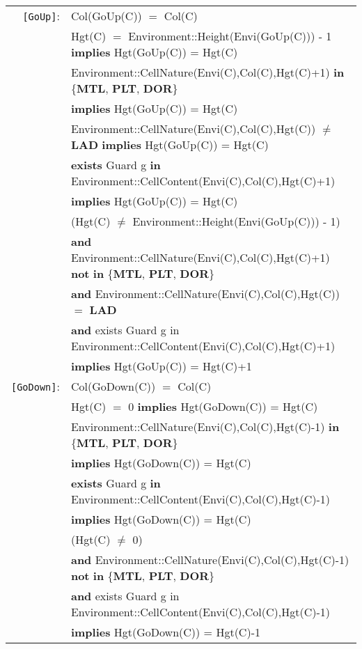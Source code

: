 \documentclass[7pt]{article}
\begin{document}
\newpage
\begin{tabular}{rl}

\texttt{[GoUp]}: & \textrm{Col(GoUp(C))} $=$ \textrm{Col(C)}\\
& \textrm{Hgt(C)} $=$ Environment::Height(Envi(GoUp(C))) - 1 \textbf{implies} \textrm{Hgt(GoUp(C))} = \textrm{Hgt(C)} \\
& \textrm{Environment::CellNature(Envi(C),Col(C),Hgt(C)+1)} \textbf{in} \{\textbf{MTL}, \textbf{PLT}, \textbf{DOR}\} \\
& \quad \textbf{implies} \textrm{Hgt(GoUp(C))} = \textrm{Hgt(C)} \\
& \textrm{Environment::CellNature(Envi(C),Col(C),Hgt(C))} $\neq$ \textbf{LAD} \textbf{implies} \textrm{Hgt(GoUp(C))} = \textrm{Hgt(C)} \\
& \textbf{exists} \textrm{Guard} g \textbf{in} \textrm{Environment::CellContent(Envi(C),Col(C),Hgt(C)+1)} \\ & \quad\quad \textbf{implies} \textrm{Hgt(GoUp(C))} = \textrm{Hgt(C)}  \\
& (\textrm{Hgt(C)} $\neq$ Environment::Height(Envi(GoUp(C))) - 1) \\ 
&  \quad\quad \textbf{and} \textrm{Environment::CellNature(Envi(C),Col(C),Hgt(C)+1)} \textbf{not} \textbf{in} \{\textbf{MTL}, \textbf{PLT}, \textbf{DOR}\} \\ 
& \quad\quad  \textbf{and} \textrm{Environment::CellNature(Envi(C),Col(C),Hgt(C))} $=$ \textbf{LAD} \\
& \quad\quad  \textbf{and} {exists} \textrm{Guard} g {in} \textrm{Environment::CellContent(Envi(C),Col(C),Hgt(C)+1)} \\ & \quad\quad \textbf{implies} \textrm{Hgt(GoUp(C))} = \textrm{Hgt(C)}+1  \\

\texttt{[GoDown]}: & \textrm{Col(GoDown(C))} $=$ \textrm{Col(C)}\\
& \textrm{Hgt(C)} $=$ 0 \textbf{implies} \textrm{Hgt(GoDown(C))} = \textrm{Hgt(C)} \\
& \textrm{Environment::CellNature(Envi(C),Col(C),Hgt(C)-1)} \textbf{in} \{\textbf{MTL}, \textbf{PLT}, \textbf{DOR}\} \\
& \quad \textbf{implies} \textrm{Hgt(GoDown(C))} = \textrm{Hgt(C)} \\
& \textbf{exists} \textrm{Guard} g \textbf{in} \textrm{Environment::CellContent(Envi(C),Col(C),Hgt(C)-1)} \\ & \quad\quad \textbf{implies} \textrm{Hgt(GoDown(C))} = \textrm{Hgt(C)}  \\
& (\textrm{Hgt(C)} $\neq$ 0) \\ 
&  \quad\quad \textbf{and} \textrm{Environment::CellNature(Envi(C),Col(C),Hgt(C)-1)} \textbf{not} \textbf{in} \{\textbf{MTL}, \textbf{PLT}, \textbf{DOR}\} \\ 
& \quad\quad  \textbf{and} {exists} \textrm{Guard} g {in} \textrm{Environment::CellContent(Envi(C),Col(C),Hgt(C)-1)} \\ & \quad\quad \textbf{implies} \textrm{Hgt(GoDown(C))} = \textrm{Hgt(C)}-1  \\

\end{tabular}
\end{document}
